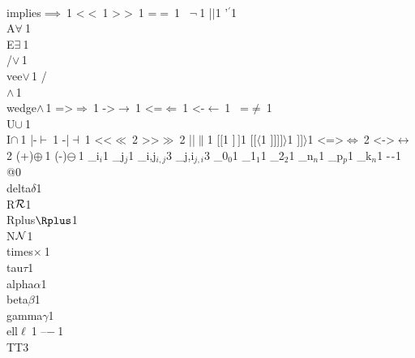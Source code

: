 {{{        {\\implies}{{$\implies\ $}}1
{<}{{$<\ $}}1
        {>}{{$>\ $}}1
        {=}{{$=\ $}}1
        {~}{{$\neg\ $}}1
        {|}{{$\mid$}}1
        {'}{{$^\prime$}}1
{\\A}{{$\forall\ $}}1
        {\\E}{{$\exists\ $}}1
        {\\/}{{$\vee\,$}}1
        {\\vee}{{$\vee\,$}}1
        {/\\}{{$\wedge\,$}}1
        {\\wedge}{{$\wedge\,$}}1
        {=>}{{$\Rightarrow\ $}}1
        {->}{{$\rightarrow\ $}}1
        {<=}{{$\Leftarrow\ $}}1
        {<-}{{$\leftarrow\ $}}1
{~=}{{$\neq\ $}}1
        {\\U}{{$\cup\ $}}1
        {\\I}{{$\cap\ $}}1
        {|-}{{$\vdash\ $}}1
        {-|}{{$\dashv\ $}}1
        {<<}{{$\ll\ $}}2
        {>>}{{$\gg\ $}}2
        {||}{{$\|$}}1
{[}{{$[$}}1
        {]}{{$\,]$}}1
        {[[}{{$\langle$}}1
        {]]]}{{$]\rangle$}}1
        {]]}{{$\rangle$}}1
        {<=>}{{$\Leftrightarrow\ $}}2
        {<->}{{$\leftrightarrow\ $}}2
        {(+)}{{$\oplus\ $}}1
        {(-)}{{$\ominus\ $}}1
        {_i}{{$_{i}$}}1
        {_j}{{$_{j}$}}1
        {_{i,j}}{{$_{i,j}$}}3
        {_{j,i}}{{$_{j,i}$}}3
        {_0}{{$_0$}}1
        {_1}{{$_1$}}1
        {_2}{{$_2$}}1
        {_n}{{$_n$}}1
        {_p}{{$_p$}}1
        {_k}{{$_n$}}1
        {-}{{$\ms{-}$}}1
        {@}{{}}0
        {\\delta}{{$\delta$}}1
        {\\R}{{${\mathcal R}$}}1
        {\\Rplus}{{$\Rplus$}}1
        {\\N}{{${\mathcal N}$}}1
        {\\times}{{$\times\ $}}1
        {\\tau}{{$\tau$}}1
        {\\alpha}{{$\alpha$}}1
        {\\beta}{{$\beta$}}1
        {\\gamma}{{$\gamma$}}1
        {\\ell}{{$\ell\ $}}1
        {--}{{$-\ $}}1
        {\\TT}{{\hspace{1.5em}}}3
      }

\newcommand{\abs}[1]{\left\lvert#1\right\rvert}
\newcommand{\pair}[1]{\left\langle#1\right\rangle}
\newcommand{\floor}[1]{\left\lfloor#1\right\rfloor}
\newcommand{\ceil}[1]{\left\lceil#1\right\rceil}
\newcommand{\norm}[1]{\left\lvert\left\lvert#1\right\rvert\right\rvert}
\newcommand{\argmin}[2]{\underset{#2}{\operatorname{argmin}} #1}
\newcommand{\argmax}[2]{\underset{#2}{\operatorname{argmax}} #1}
\newcommand{\maxel}[2]{\underset{#2}{\operatorname{max}} #1}
\newcommand{\minel}[2]{\underset{#2}{\operatorname{min}} #1}
\newcommand{\supel}[2]{\underset{#2}{\operatorname{sup}} #1}
\newcommand{\infel}[2]{\underset{#2}{\operatorname{inf}} #1}
\newcommand{\sgn}[1]{\operatorname{sgn} \left( #1 \right)}
\newcommand{\lima}[2]{\underset{#2}{\operatorname{lim}} #1}
\newcommand{\ds}[1]{\left\llbracket#1\right\rrbracket}	

}}
